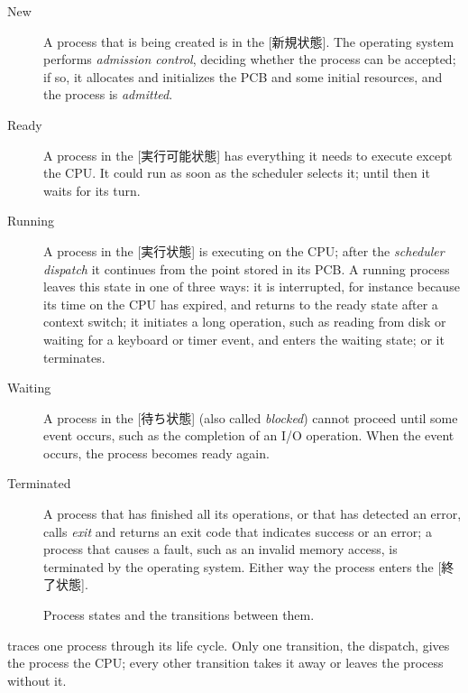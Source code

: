 \documentclass[../main.tex]{subfiles}
\begin{document}
\begin{description}
  \item[New] A process that is being created is in the
    [新規状態].  The operating system performs
    \emph{admission control}, deciding whether the process can be accepted;
    if so, it allocates and initializes the PCB and some initial
    resources, and the process is \emph{admitted}.
  \item[Ready] A process in the [実行可能状態] has
    everything it needs to execute except the CPU.  It could run as soon as
    the scheduler selects it; until then it waits for its turn.
  \item[Running] A process in the [実行状態] is
    executing on the CPU; after the \emph{scheduler dispatch} it continues
    from the point stored in its PCB.  A running process leaves this state
    in one of three ways: it is interrupted, for instance because its time
    on the CPU has expired, and returns to the ready state after a context
    switch; it initiates a long operation, such as reading from disk or
    waiting for a keyboard or timer event, and enters the waiting state; or
    it terminates.
  \item[Waiting] A process in the [待ち状態] (also
    called \emph{blocked}) cannot proceed until some event occurs, such as the completion of an I/O
    operation.  When the event occurs, the process becomes ready
    again.
  \item[Terminated] A process that has finished all its operations, or that
    has detected an error, calls \emph{exit} and returns an exit code that
    indicates success or an error; a process that causes a fault, such as
    an invalid memory access, is terminated by the operating system.
    Either way the process enters the
    [終了状態].
\end{description}

\begin{figure}[htbp]
  \centering
  
  \caption{Process states and the transitions between them.}
  \label{fig:l02-states}
\end{figure}

 traces one process through its life
cycle.  Only one
 transition, the dispatch, gives the process the CPU; every other
transition takes it away or leaves the process without it.
\end{document}
